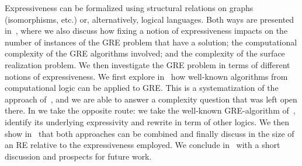 Expressiveness can be formalized using
structural relations on graphs (isomorphisms, etc.) or, alternatively, logical languages.
Both ways are presented in~, where we also discuss
how fixing a notion of expressiveness impacts on
the number of instances of the GRE problem that have a solution; the
computational complexity of the GRE algorithms involved; and the
complexity of the surface realization problem.
We then investigate the GRE problem in terms of different notions of
expressiveness. We first explore in~ how well-known algorithms
from computational logic can be applied to GRE. This is a systematization of the
approach of~\cite{AKS08}, and we are able to answer a complexity
question that was left open there. In  we take the opposite route:
we take the well-known GRE-algorithm of~\cite{Krahmer2003}, identify its
underlying expressivity and rewrite in term of other logics. We then show in~
that both approaches can be combined and finally discuss in  the size of
an RE relative to the expressiveness employed. We conclude in~ with
a short discussion and prospects for future work.



